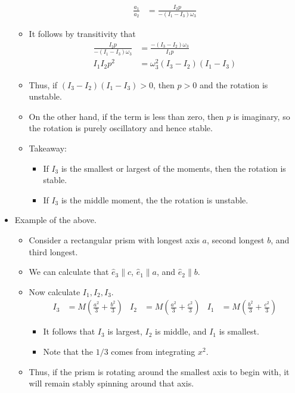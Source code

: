 \documentclass[../notes.tex]{subfiles}
\begin{document}
\begin{itemize}
\begin{itemize}
\begin{align*}
            \frac{a_1}{a_2} &= \frac{I_2p}{-(I_1-I_3)\omega_3}
        \end{align*}
        \item It follows by transitivity that
        \begin{align*}
            \frac{I_2p}{-(I_1-I_3)\omega_3} &= \frac{-(I_3-I_2)\omega_3}{I_1p}\\
            I_1I_2p^2 &= \omega_3^2(I_3-I_2)(I_1-I_3)
        \end{align*}
        \item Thus, if $(I_3-I_2)(I_1-I_3)>0$, then $p>0$ and the rotation is unstable.
        \item On the other hand, if the term is less than zero, then $p$ is imaginary, so the rotation is purely oscillatory and hence stable.
        \item Takeaway:
        \begin{itemize}
            \item If $I_3$ is the smallest or largest of the moments, then the rotation is stable.
            \item If $I_3$ is the middle moment, the the rotation is unstable.
        \end{itemize}
    \end{itemize}
    \item Example of the above.
    \begin{itemize}
        \item Consider a rectangular prism with longest axis $a$, second longest $b$, and third longest.
        \item We can calculate that $\hat{e}_3\parallel c$, $\hat{e}_1\parallel a$, and $\hat{e}_2\parallel b$.
        \item Now calculate $I_1,I_2,I_3$.
        \begin{align*}
            I_3 &= M\left( \frac{a^2}{3}+\frac{b^2}{3} \right)&
            I_2 &= M\left( \frac{a^2}{3}+\frac{c^2}{3} \right)&
            I_1 &= M\left( \frac{b^2}{3}+\frac{c^2}{3} \right)
        \end{align*}
        \begin{itemize}
            \item It follows that $I_3$ is largest, $I_2$ is middle, and $I_1$ is smallest.
            \item Note that the $1/3$ comes from integrating $x^2$.
        \end{itemize}
        \item Thus, if the prism is rotating around the smallest axis to begin with, it will remain stably spinning around that axis.

\end{itemize}
\end{itemize}
\end{document}
